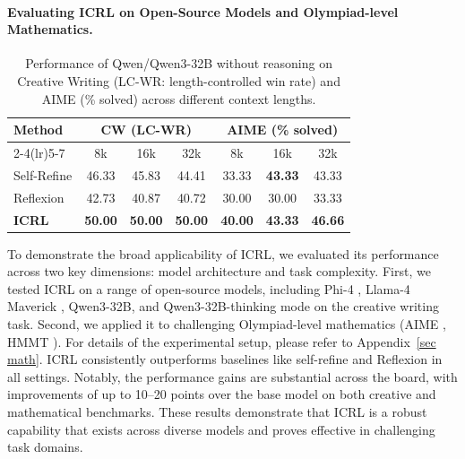 \documentclass{article}
\newcommand{\0}{\mathbf{0}}
\begin{document}
\paragraph{Evaluating ICRL on Open-Source Models and Olympiad-level Mathematics.}
\begin{table}
  \centering
  \small
  \setlength{\tabcolsep}{3pt}
  \renewcommand{\arraystretch}{1.2}
  \caption{Performance of Qwen/Qwen3-32B without reasoning on Creative Writing (LC-WR: length-controlled win rate) and AIME (\% solved) across different context lengths.}
  \label{tab:qwen32b_context}
  \begin{tabular}{@{}l|ccc|ccc@{}}
    \toprule
    \multirow{2}{*}{Method} &
    \multicolumn{3}{c|}{CW (LC-WR)} &
    \multicolumn{3}{c}{AIME (\% solved)} \\
    \cmidrule(lr){2-4}\cmidrule(lr){5-7}
    & 8k & 16k & 32k & 8k & 16k & 32k \\
    \midrule
    Self-Refine & 46.33 & 45.83 & 44.41 & 33.33 & \textbf{43.33} & 43.33 \\
    Reflexion   & 42.73 & 40.87 & 40.72 & 30.00 & 30.00 & 33.33 \\
    \textbf{ICRL} & \textbf{50.00} & \textbf{50.00} & \textbf{50.00} &
    \textbf{40.00} & \textbf{43.33} & \textbf{46.66} \\
    \bottomrule
  \end{tabular}
\end{table}
To demonstrate the broad applicability of ICRL, we evaluated its performance across two key dimensions: model architecture and task complexity. First, we tested ICRL on a range of open-source models, including Phi-4 \citep{abdin2024phi4technicalreport}, Llama-4 Maverick \citep{meta2025llama4}, Qwen3-32B, and Qwen3-32B-thinking mode \citep{yang2025qwen3technicalreport} on the creative writing task. Second, we applied it to challenging Olympiad-level mathematics (AIME \citep{aime}, HMMT \citep{hmmt}). For details of the experimental setup, please refer to Appendix~\ref{sec math}. ICRL consistently outperforms baselines like self-refine and Reflexion in all settings. Notably, the performance gains are substantial across the board, with improvements of up to 10--20 points over the base model on both creative and mathematical benchmarks. These results demonstrate that ICRL is a robust capability that exists across diverse models and proves effective in challenging task domains.
\end{document}

